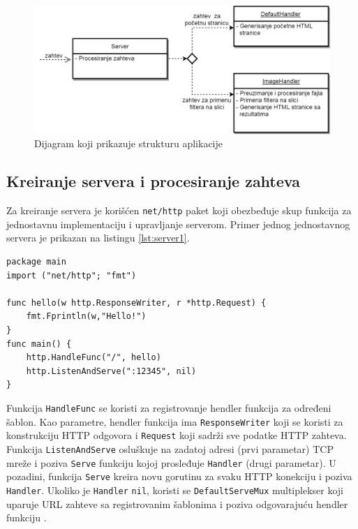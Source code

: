 \documentclass[12pt,oneside]{memoir}
\begin{document}
\begin{figure}
\begin{center}
\includegraphics[scale=0.45]{dijagram.png}
\end{center}
\caption{Dijagram koji prikazuje strukturu aplikacije}
\label{fig:diag}
\end{figure}

\subsection{Kreiranje servera i procesiranje zahteva}

Za kreiranje servera je korišćen \texttt{net/http} paket koji obezbeđuje skup funkcija za jednostavnu implementaciju i upravljanje serverom. Primer jednog jednostavnog servera je prikazan na listingu \ref{lst:server1}. 

\begin{center}
\begin{lstlisting}[caption=Primer jednostavnog servera,label={lst:server1},   backgroundcolor=\color{background}]
package main
import ("net/http"; "fmt")

func hello(w http.ResponseWriter, r *http.Request) {
	fmt.Fprintln(w,"Hello!")
}
func main() {
	http.HandleFunc("/", hello)
	http.ListenAndServe(":12345", nil)
}
\end{lstlisting}
\end{center}


Funkcija \texttt{HandleFunc} se koristi za registrovanje hendler funkcija za određeni šablon. Kao parametre, hendler funkcija ima \texttt{ResponseWriter} koji se koristi za konstrukciju HTTP odgovora i \texttt{Request} koji sadrži sve podatke HTTP zahteva. Funkcija \texttt{ListenAndServe} osluškuje na zadatoj adresi (prvi parametar) TCP mreže i poziva \texttt{Serve} funkciju kojoj prosleđuje \texttt{Handler} (drugi parametar). U pozadini, funkcija \texttt{Serve} kreira novu gorutinu za svaku HTTP konekciju i poziva \texttt{Handler}. Ukoliko je \texttt{Handler} \texttt{nil}, koristi se \texttt{DefaultServeMux} multiplekser koji uparuje URL zahteve sa registrovanim šablonima i poziva odgovarajuću hendler funkciju \cite{http}.
\end{document}
